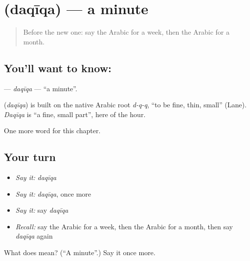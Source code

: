 \section[\texorpdfstring{\ar{دقيقة} (daqīqa)}{دقيقة (daqīqa)}]{ (daqīqa) — a minute}

\label{lesson:AR-C86-daqiqa}



\begin{quote}
Before the new one: say the Arabic for a week, then the Arabic for a month.
\end{quote}

\subsection*{You'll want to know: }
\textbf{} — \emph{daqīqa} — \textquotedblleft{}a minute\textquotedblright{}.

\begin{cousinweb}
\textbf{} (\emph{daqīqa}) is built on the native Arabic root \emph{d-q-q}, \textquotedblleft{}to be fine, thin, small\textquotedblright{} (Lane). \emph{Daqīqa} is \textquotedblleft{}a fine, small part\textquotedblright{}, here of the hour.
\end{cousinweb}

\begin{grammarlens}[title={What you've built}]
One more word for this chapter.
\end{grammarlens}

\subsection*{Your turn}
\begin{itemize}
\raggedright
  \item \emph{Say it:} \emph{daqīqa}
  \item \emph{Say it:} \emph{daqīqa}, once more
  \item \emph{Say it:} say \emph{daqīqa}
  \item \emph{Recall:} say the Arabic for a week, then the Arabic for a month, then say \emph{daqīqa} again
\end{itemize}

\begin{tcolorbox}[breakable,colback=teal!4,colframe=teal!35!black,title={Before you move on}]
What does  mean? (\textquotedblleft{}A minute\textquotedblright{}.) Say it once more.
\end{tcolorbox}
